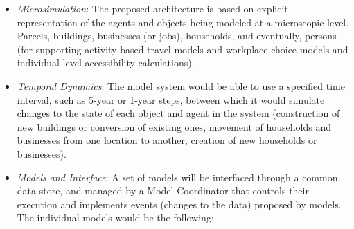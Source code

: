 \begin{itemize}
\item \emph{Microsimulation}: The proposed architecture is based on
explicit representation of the agents and objects being modeled at a
microscopic level.  Parcels, buildings, businesses (or jobs),
households, and eventually, persons (for supporting activity-based
travel models and workplace choice models and individual-level
accessibility calculations).

\item \emph{Temporal Dynamics}: The model system would be able to
use a specified time interval, such as 5-year or 1-year steps,
between which it would simulate changes to the state of each object
and agent in the system (construction of new buildings or conversion
of existing ones, movement of households and businesses from one
location to another, creation of new households or businesses).

\item \emph{Models and Interface}: A set of models will be interfaced
through a common data store, and managed by a Model Coordinator that
controls their execution and implements events (changes to the data)
proposed by models.  The individual models would be the following:


\end{itemize}
